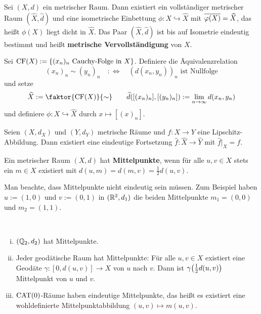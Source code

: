 \begin{erinnerung}
\label{erin:1.31}
	Sei $(X,d)$ ein metrischer Raum.
	Dann existiert ein vollständiger metrischer Raum $(\widehat{X},\widehat{d})$ und eine isometrische Einbettung $\phi\colon X \hookrightarrow \widehat{X}$ mit $\overline{\varphi(X)} = \widehat{X}$, das heißt $\phi(X)$ liegt dicht in $\widehat{X}$.
	Das Paar $(\widehat{X},\widehat{d})$ ist bis auf Isometrie eindeutig bestimmt und heißt \textbf{metrische Vervollständigung} von $X$. 
\end{erinnerung}

\begin{beweis}[Skizze]
	Sei $\operatorname{CF}(X) := \{ (x_n)_n \text{ Cauchy-Folge in } X\}$. Definiere die Äquivalenzrelation
	\[
		(x_n)_n \sim (y_n)_n \quad :\Leftrightarrow \quad (d(x_n,y_n))_n \text{ ist Nullfolge}
	\]
	und setze
	\[
		\widehat{X} := \faktor{\CF(X)}{\sim} \qquad \widehat{d}([(x_n)_n],[(y_n)_n]) := \lim\limits_{n \rightarrow \infty} d(x_n,y_n)
	\]
	und definiere $\phi \colon X \hookrightarrow \widehat{X}$ durch $x \mapsto [(x)_n]$. \qedhere
\end{beweis}

\begin{erinnerung}
\label{erin:1.32}
	Seien $(X,d_X)$ und $(Y,d_Y)$ metrische Räume und $f \colon X \rightarrow Y$ eine Lipschitz-Abbildung. 
	Dann existiert eine eindeutige Fortsetzung $\widehat{f}\colon \widehat{X} \rightarrow \widehat{Y}$ mit $\widehat{f}\big|_X = f$.
\end{erinnerung}

\begin{definition}[Mittelpunkt]
\label{def:1.33}
	Ein metrischer Raum $(X,d)$ hat \textbf{Mittelpunkte}, wenn für alle $u,v \in X$ stets ein $m \in X$ existiert mit $d(u,m) = d(m,v) = \frac{1}{2}d(u,v)$. 
\end{definition}

Man beachte, dass Mittelpunkte nicht eindeutig sein müssen. Zum Beispiel haben $u := (1,0)$ und $v:= (0,1)$ in $(\mathbb{R}^2,d_1)$ die beiden Mittelpunkte $m_1 = (0,0)$ und $m_2 = (1,1)$.

\begin{beispiel}
\label{bsp:1.34}
	\mbox{} \\[-1.4cm]
	\begin{enumerate}[(i)]
		\item $(\mathbb{Q}_2,d_2)$ hat Mittelpunkte.
		\item Jeder geodätische Raum hat Mittelpunkte: Für alle $u,v \in X$ existiert eine Geodäte $\gamma\colon [0,d(u,v)] \rightarrow X$ von $u$ nach $v$. Dann ist $\gamma\enbrace*{\frac{1}{2} d(u,v)}$ Mittelpunkt von $u$ und $v$.
		\item $\operatorname{CAT(0)}$-Räume haben eindeutige Mittelpunkte, das heißt es existiert eine wohldefinierte Mittelpunktabbildung $(u,v) \mapsto m(u,v)$.
	\end{enumerate}
\end{beispiel}

